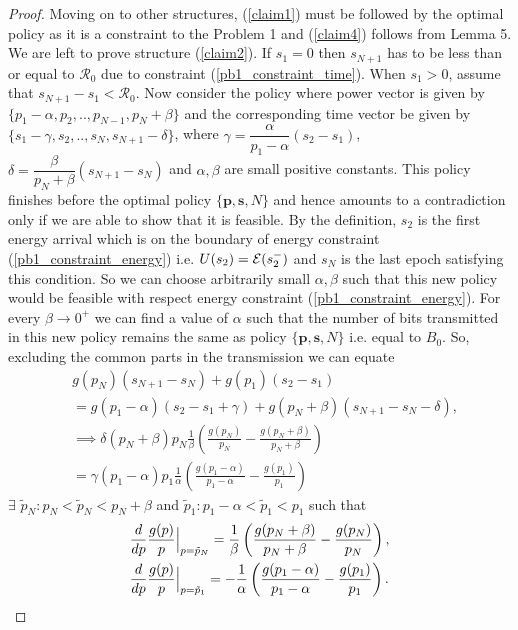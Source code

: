 \begin{proof}
Moving on to other structures, (\ref{claim1}) must be followed by the optimal policy as it is a constraint to the Problem 1 and (\ref{claim4}) follows from Lemma 5. We are left to prove structure (\ref{claim2}). If $s_1=0$ then $s_{N+1}$ has to be less than or equal to $\mathcal{R}_0$ due to constraint (\ref{pb1_constraint_time}). When $s_1>0$, assume that $s_{N+1}-s_1<\mathcal{R}_0$. Now consider the policy where power vector is given by $\{p_1-\alpha,p_2,..,p_{N-1},p_N+\beta \}$ and the corresponding time vector be given by $\{s_1-\gamma,s_2,..,s_{N},s_{N+1}-\delta\}$, where $\gamma=\dfrac{\alpha}{p_1-\alpha}(s_2-s_1)$, $\delta =\dfrac{\beta}{p_N+\beta}(s_{N+1}-s_N)$ and $\alpha ,\beta$ are small positive constants. This policy finishes before the optimal policy $\{\textbf{p},\textbf{s},N\}$ and hence amounts to a contradiction only if we are able to show that it is feasible. By the definition, $s_{2}$ is the first energy arrival which is on the boundary of energy constraint (\ref{pb1_constraint_energy}) i.e. $U(s_2)=\mathcal{E}(s_2^-)$ and $s_{N}$ is the last epoch satisfying this condition. So we can choose arbitrarily small $\alpha ,\beta$ such that this new policy would be feasible with respect energy constraint (\ref{pb1_constraint_energy}). For every $\beta\rightarrow 0^+$ we can find a value of $\alpha$ such that the number of bits transmitted in this new policy remains the same as policy $\{\textbf{p},\textbf{s},N\}$ i.e. equal to $B_0$. So, excluding the common parts in the transmission we can equate
\begin{align}
&g(p_N)(s_{N+1}-s_N)+g(p_1)(s_2-s_1)\nonumber
\\
&=g(p_1-\alpha)(s_2-s_1+\gamma)+g(p_N+\beta)(s_{N+1}-s_N-\delta)\nonumber,
\\
&\implies \delta(p_N+\beta)p_N\frac{1}{\beta}\left(\frac{g(p_N)}{p_N}-\frac{g(p_N+\beta)}{p_N+\beta}\right)\nonumber
\\
&=\gamma(p_1-\alpha)p_1\frac{1}{\alpha}\left(\frac{g(p_1-\alpha)}{p_1-\alpha}-\frac{g(p_1)}{p_1}\right)\label{bits_equal}
\end{align}
$\exists$ $\tilde{p}_N:p_N<\tilde{p}_N<p_{N}+\beta$ and $\tilde{p}_1:p_1-\alpha<\tilde{p}_1<p_{1}$ such that
\begin{align}
&\frac{d}{dp} \frac{g(p)}{p} \Big{\vert}_{p=\tilde{p}_N}=\frac{1}{\beta}\left(\frac{g(p_N+\beta)}{p_N+\beta}-\frac{g(p_N)}{p_N}\right),\label{diff_1}
\\
&\frac{d}{dp} \frac{g(p)}{p}\Big{\vert}_{p=\tilde{p}_1}=-\frac{1}{\alpha}\left(\frac{g(p_1-\alpha)}{p_1-\alpha}-\frac{g(p_1)}{p_1}\right)\label{diff_2}.

\end{align}
\end{proof}
